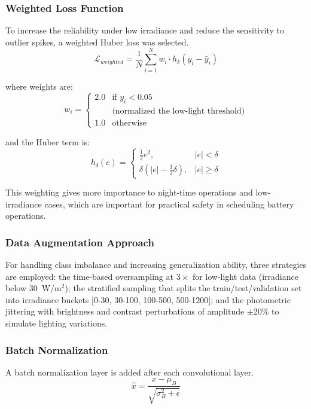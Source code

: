\documentclass[journal]{IEEEtran}
\begin{document}
\subsubsection{Weighted Loss Function}
To increase the reliability under low irradiance and reduce the sensitivity to outlier spikes, a weighted Huber loss was selected.
\begin{equation}
\mathcal{L}_{weighted} = \frac{1}{N}\sum_{i=1}^{N} w_i \cdot h_{\delta}(y_i - \hat{y}_i)
\end{equation}

where weights are:
\begin{equation}
w_i = \begin{cases}
2.0 & \text{if } y_i < 0.05 \\
& \text{(normalized the low-light threshold)} \\
1.0 & \text{otherwise}
\end{cases}
\end{equation}

and the Huber term is:
\begin{equation}
h_{\delta}(e)=
\begin{cases}
\frac{1}{2}e^2, & |e|<\delta \\
\delta\left(|e|-\frac{1}{2}\delta\right), & |e|\ge\delta
\end{cases}
\end{equation}

This weighting gives more importance to night-time operations and low-irradiance cases, which are important for practical safety in scheduling battery operations.

\subsubsection{Data Augmentation Approach}
For handling class imbalance and increasing generalization ability, three strategies are employed: the time-based oversampling at $3\times$ for low-light data (irradiance below 30~W/m$^2$); the stratified sampling that splits the train/test/validation set into irradiance buckets [0-30, 30-100, 100-500, 500-1200]; and the photometric jittering with brightness and contrast perturbations of amplitude $\pm$20\% to simulate lighting variations.

\subsubsection{Batch Normalization}
A batch normalization layer is added after each convolutional layer.\cite{ref8}
\begin{equation}
\hat{x} = \frac{x - \mu_B}{\sqrt{\sigma_B^2 + \epsilon}} 
\end{equation}
\end{document}
